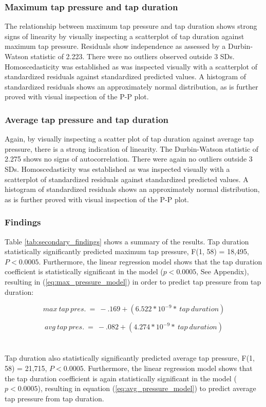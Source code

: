 \documentclass{sigchi}
\begin{document}
\subsubsection{Maximum tap pressure and tap duration}
The relationship between maximum tap pressure and tap duration shows strong signs of linearity by visually inspecting a scatterplot of tap duration against maximum tap pressure. Residuals show independence as assessed by a Durbin-Watson statistic of 2.223. There were no outliers observed outside 3 SDs. Homoscedasticity was established as was inspected visually with a scatterplot of standardized residuals against standardized predicted values. A histogram of standardized residuals shows an approximately normal distribution, as is further proved with visual inspection of the P-P plot.

\subsubsection{Average tap pressure and tap duration}
Again, by visually inspecting a scatter plot of tap duration against average tap pressure, there is a strong indication of linearity. The Durbin-Watson statistic of 2.275 shows no signs of autocorrelation. There were again no outliers outside 3 SDs. Homoscedasticity was established as was inspected visually with a scatterplot of standardized residuals against standardized predicted values. A histogram of standardized residuals shows an approximately normal distribution, as is further proved with visual inspection of the P-P plot.

\subsubsection{Findings}

Table \ref{tab:secondary_findings} shows a summary of the results. Tap duration statistically significantly predicted maximum tap pressure, F(1, 58) = 18,495, $P < 0.0005$. Furthermore, the linear regression model shows that the tap duration coefficient is statistically significant in the model ($p < 0.0005$, See Appendix), resulting in (\ref{eq:max_pressure_model}) in order to predict tap pressure from tap duration:

\begin{equation}
max\ tap\ pres.\ =\ -.169 + (6.522*10^{-9} *\ tap\ duration)
\label{eq:max_pressure_model}
\end{equation}

\begin{equation}
avg\ tap\ pres.\ =\ -.082 + (4.274*10^{-9} *\ tap\ duration)
\label{eq:avg_pressure_model}
\end{equation}
\\\\
Tap duration also statistically significantly predicted average tap pressure, F(1, 58) = 21,715, $P < 0.0005$. Furthermore, the linear regression model shows that the tap duration coefficient is again statistically significant in the model ($p < 0.0005$), resulting in equation (\ref{eq:avg_pressure_model}) to predict average tap pressure from tap duration.
\end{document}
